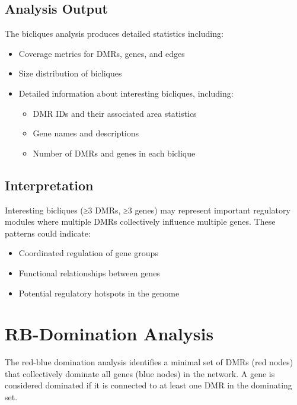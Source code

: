 \documentclass{article}
\begin{document}
\subsection{Analysis Output}
The bicliques analysis produces detailed statistics including:
\begin{itemize}
    \item Coverage metrics for DMRs, genes, and edges
    \item Size distribution of bicliques
    \item Detailed information about interesting bicliques, including:
    \begin{itemize}
        \item DMR IDs and their associated area statistics
        \item Gene names and descriptions
        \item Number of DMRs and genes in each biclique
    \end{itemize}
\end{itemize}

\subsection{Interpretation}
Interesting bicliques (≥3 DMRs, ≥3 genes) may represent important regulatory modules where multiple DMRs collectively influence multiple genes. These patterns could indicate:
\begin{itemize}
    \item Coordinated regulation of gene groups
    \item Functional relationships between genes
    \item Potential regulatory hotspots in the genome
\end{itemize}

\section{RB-Domination Analysis}
The red-blue domination analysis identifies a minimal set of DMRs (red nodes) that collectively dominate all genes (blue nodes) in the network. A gene is considered dominated if it is connected to at least one DMR in the dominating set.
\end{document}
